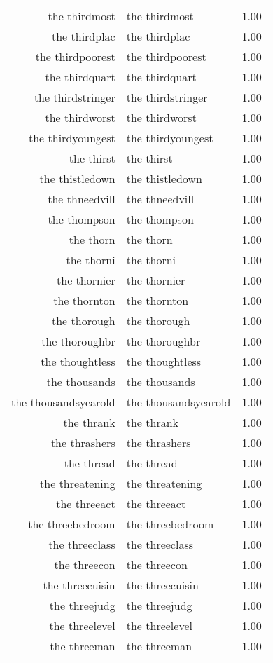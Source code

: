 \begin{table}[ht]
\begin{tabular}{rlr}
  the thirdmost & the thirdmost & 1.00 \\ 
  the thirdplac & the thirdplac & 1.00 \\ 
  the thirdpoorest & the thirdpoorest & 1.00 \\ 
  the thirdquart & the thirdquart & 1.00 \\ 
  the thirdstringer & the thirdstringer & 1.00 \\ 
  the thirdworst & the thirdworst & 1.00 \\ 
  the thirdyoungest & the thirdyoungest & 1.00 \\ 
  the thirst & the thirst & 1.00 \\ 
  the thistledown & the thistledown & 1.00 \\ 
  the thneedvill & the thneedvill & 1.00 \\ 
  the thompson & the thompson & 1.00 \\ 
  the thorn & the thorn & 1.00 \\ 
  the thorni & the thorni & 1.00 \\ 
  the thornier & the thornier & 1.00 \\ 
  the thornton & the thornton & 1.00 \\ 
  the thorough & the thorough & 1.00 \\ 
  the thoroughbr & the thoroughbr & 1.00 \\ 
  the thoughtless & the thoughtless & 1.00 \\ 
  the thousands & the thousands & 1.00 \\ 
  the thousandsyearold & the thousandsyearold & 1.00 \\ 
  the thrank & the thrank & 1.00 \\ 
  the thrashers & the thrashers & 1.00 \\ 
  the thread & the thread & 1.00 \\ 
  the threatening & the threatening & 1.00 \\ 
  the threeact & the threeact & 1.00 \\ 
  the threebedroom & the threebedroom & 1.00 \\ 
  the threeclass & the threeclass & 1.00 \\ 
  the threecon & the threecon & 1.00 \\ 
  the threecuisin & the threecuisin & 1.00 \\ 
  the threejudg & the threejudg & 1.00 \\ 
  the threelevel & the threelevel & 1.00 \\ 
  the threeman & the threeman & 1.00 \\ 

\end{tabular}
\end{table}
